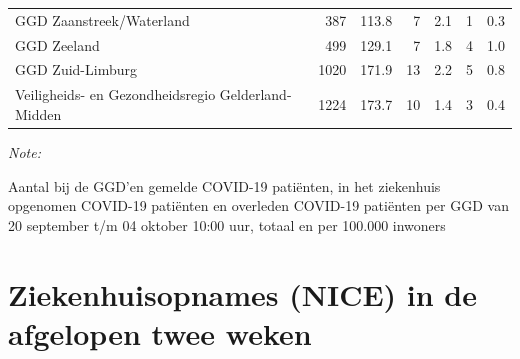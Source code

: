 \documentclass[
  english,
  man,floatsintext]{apa6}
\begin{document}
\begin{table}
\begin{threeparttable}
\begin{tabular}{lrrrrrr}
GGD Zaanstreek/Waterland & 387 & 113.8 & 7 & 2.1 & 1 & 0.3\\
GGD Zeeland & 499 & 129.1 & 7 & 1.8 & 4 & 1.0\\
GGD Zuid-Limburg & 1020 & 171.9 & 13 & 2.2 & 5 & 0.8\\
Veiligheids- en Gezondheidsregio Gelderland-Midden & 1224 & 173.7 & 10 & 1.4 & 3 & 0.4\\
\bottomrule
\end{tabular}
\begin{tablenotes}
\item \textit{Note: } 
\item Aantal bij de GGD’en gemelde COVID-19 patiënten, in het ziekenhuis opgenomen COVID-19 patiënten en overleden COVID-19 patiënten per GGD van 20 september t/m 04 oktober 10:00 uur, totaal en per 100.000 inwoners
\end{tablenotes}
\end{threeparttable}
\endgroup{}
\end{table}

\newpage

\hypertarget{ziekenhuisopnames-nice-in-de-afgelopen-twee-weken}{%
\section{Ziekenhuisopnames (NICE) in de afgelopen twee weken}\label{ziekenhuisopnames-nice-in-de-afgelopen-twee-weken}}
\end{document}
